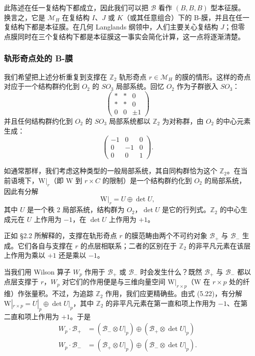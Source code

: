 \documentclass[11pt,a4paper]{article}
\begin{document}
此陈述在任一复结构下都成立，因此我们可以把 $\mathcal{B}$ 看作 $(B,B,B)$ 型本征膜。换言之，它是 $\mathcal{M}_H$ 在复结构 $I$、$J$ 或 $K$（或其任意组合）下的 B-膜，并且在任一复结构下都是本征膜。在几何 Langlands 纲领中，人们主要关心复结构 $J$；但零点膜同时在三个复结构下都是本征膜这一事实会简化计算，这一点将逐渐清楚。

\subsubsection{轨形奇点处的 B-膜}

我们希望把上述分析重复到支撑在 $\mathbb{Z}_2$ 轨形奇点 $r\in\mathcal{M}_H$ 的膜的情形。这样的奇点对应于一个结构群约化到 $O_2$ 的 $SO_3$ 局部系统。回忆 $O_2$ 作为子群嵌入 $SO_3$：
\begin{equation}\tag{5.20}
\begin{pmatrix}
* & * & 0\\
* & * & 0\\
0 & 0 & \pm 1
\end{pmatrix}
\end{equation}
并且任何结构群约化到 $O_2$ 的 $SO_3$ 局部系统都以 $\mathbb{Z}_2$ 为对称群，由 $O_2$ 的中心元素生成：
\begin{equation}\tag{5.21}
\begin{pmatrix}
-1 & 0 & 0\\
0 & -1 & 0\\
0 & 0 & 1
\end{pmatrix}.
\end{equation}

如通常那样，我们考虑这种类型的一般局部系统，其自同构群恰为这个 $\mathbb{Z}_2$。在当前语境下，$\mathrm{W}|_r$（即 $\mathrm{W}$ 到 $r\times C$ 的限制）是一个结构群约化到 $O_2$ 的局部系统，因此有分解
\begin{equation}\tag{5.22}
\mathrm{W}|_r=U\oplus\det U,
\end{equation}
其中 $U$ 是一个秩 2 局部系统，结构群为 $O_2$，$\det U$ 是它的行列式。$\mathbb{Z}_2$ 的中心生成元在 $U$ 上作用为 $-1$，在 $\det U$ 上作用为 $+1$。

正如 §2.2 所解释的，支撑在轨形奇点 $r$ 的膜范畴由两个不可约对象 $\mathcal{B}_+$ 与 $\mathcal{B}_-$ 生成。它们各自与支撑在 $r$ 的点层相联系；二者的区别在于 $\mathbb{Z}_2$ 的非平凡元素在该层上作用为乘以 $+1$ 还是乘以 $-1$。

当我们用 Wilson 算子 $W_p$ 作用于 $\mathcal{B}_+$ 或 $\mathcal{B}_-$ 时会发生什么？既然 $\mathcal{B}_+$ 与 $\mathcal{B}_-$ 都以点层支撑于 $r$，$W_p$ 对它们的作用便是与三维向量空间 $\mathrm{W}|_{r\times p}$（$\mathrm{W}$ 在 $r\times p$ 处的纤维）作张量积。不过，为追踪 $\mathbb{Z}_2$ 作用，我们应更精确些。由式 (5.22)，有分解 $\mathrm{W}|_{r\times p}=U|_p\oplus\det U|_p$，其中 $\mathbb{Z}_2$ 的非平凡元素在第一直和项上作用为 $-1$、在第二直和项上作用为 $+1$。于是
\begin{equation}\tag{5.23}
\begin{aligned}
W_p\cdot\mathcal{B}_+ &= (\mathcal{B}_-\otimes U|_p)\oplus(\mathcal{B}_+\otimes\det U|_p)\\
W_p\cdot\mathcal{B}_- &= (\mathcal{B}_+\otimes U|_p)\oplus(\mathcal{B}_-\otimes\det U|_p).
\end{aligned}
\end{equation}
\end{document}
